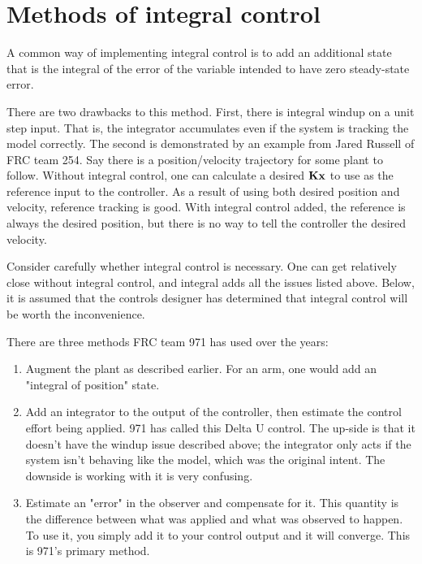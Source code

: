 \chapter{Methods of integral control} \label{ch:integral-control}

A common way of implementing integral control is to add an additional state that
is the integral of the error of the variable intended to have zero steady-state
error.

There are two drawbacks to this method. First, there is integral windup on a
unit step input. That is, the integrator accumulates even if the system is
tracking the model correctly. The second is demonstrated by an example from
Jared Russell of FRC team 254. Say there is a position/velocity trajectory for
some plant to follow. Without integral control, one can calculate a desired
$\mathbf{K}\mathbf{x}$ to use as the reference input to the controller. As a result of
using both desired position and velocity, reference tracking is good. With
integral control added, the reference is always the desired position, but there
is no way to tell the controller the desired velocity.

Consider carefully whether integral control is necessary. One can get relatively
close without integral control, and integral adds all the issues listed above.
Below, it is assumed that the controls designer has determined that integral
control will be worth the inconvenience.

There are three methods FRC team 971 has used over the years:

\begin{enumerate}
  \item Augment the plant as described earlier. For an arm, one would add an
    "integral of position" state.
  \item Add an integrator to the output of the controller, then estimate the
    control effort being applied. 971 has called this Delta U control. The
    up-side is that it doesn't have the windup issue described above; the
    integrator only acts if the system isn't behaving like the model, which was
    the original intent. The downside is working with it is very confusing.
  \item Estimate an "error" in the observer and compensate for it. This quantity
    is the difference between what was applied and what was observed to happen.
    To use it, you simply add it to your control output and it will converge.
    This is 971's primary method.
\end{enumerate}

